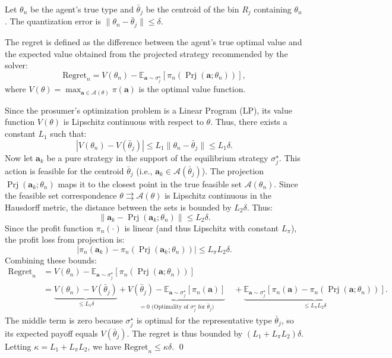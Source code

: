 \documentclass[12pt, notitlepage]{article}
\begin{document}
Let $\theta_n$ be the agent's true type and $\bar{\theta}_j$ be the centroid of the bin $R_j$ containing $\theta_n$. The quantization error is $\|\theta_n - \bar{\theta}_j\| \le \delta$.

The regret is defined as the difference between the agent's true optimal value and the expected value obtained from the projected  strategy recommended by the solver:
$$\text{Regret}_n = V(\theta_n) - \mathbb{E}_{\mathbf{a} \sim \sigma_j^\star} \left[ \pi_n(\operatorname{Prj}(\mathbf{a}; \theta_n)) \right],$$
where $V(\theta) = \max_{\mathbf{a} \in \mathcal{A}(\theta)} \pi(\mathbf{a})$ is the optimal value function.

Since the prosumer's optimization problem is a Linear Program (LP), its value function $V(\theta)$ is Lipschitz continuous with respect to $\theta$. Thus, there exists a constant $L_1$ such that:
$$|V(\theta_n) - V(\bar{\theta}_j)| \le L_1 \|\theta_n - \bar{\theta}_j\| \le L_1 \delta.$$
Now let $\mathbf{a}_k$ be a pure strategy in the support of the equilibrium strategy $\sigma_j^\star$. This action is feasible for the centroid $\bar{\theta}_j$ (i.e., $\mathbf{a}_k \in \mathcal{A}(\bar{\theta}_j)$). The projection $\operatorname{Prj}(\mathbf{a}_k; \theta_n)$ maps it to the closest point in the true feasible set $\mathcal{A}(\theta_n)$. Since the feasible set correspondence $\theta \rightrightarrows \mathcal{A}(\theta)$ is Lipschitz continuous in the Hausdorff metric, the distance between the sets is bounded by $L_2 \delta$. Thus:
$$\|\mathbf{a}_k - \operatorname{Prj}(\mathbf{a}_k; \theta_n)\| \le L_2 \delta.$$
Since the profit function $\pi_n(\cdot)$ is linear (and thus Lipschitz with constant $L_\pi$), the profit loss from projection is:
$$|\pi_n(\mathbf{a}_k) - \pi_n(\operatorname{Prj}(\mathbf{a}_k; \theta_n))| \le L_\pi L_2 \delta.$$
Combining these bounds:
\begin{align*}
\text{Regret}_n &= V(\theta_n) - \mathbb{E}_{\mathbf{a} \sim \sigma_j^\star} [\pi_n(\operatorname{Prj}(\mathbf{a}; \theta_n))] \\
&= \underbrace{V(\theta_n) - V(\bar{\theta}_j)}_{\le L_1 \delta}
+ \underbrace{V(\bar{\theta}_j) - \mathbb{E}_{\mathbf{a} \sim \sigma_j^\star}[\pi_n(\mathbf{a})]}_{= 0 \text{ (Optimality of } \sigma_j^\star \text{ for } \bar{\theta}_j)} 
\quad + \underbrace{\mathbb{E}_{\mathbf{a} \sim \sigma_j^\star}[\pi_n(\mathbf{a}) - \pi_n(\operatorname{Prj}(\mathbf{a}; \theta_n))]}_{\le L_\pi L_2 \delta}.
\end{align*}
The middle term is zero because $\sigma_j^\star$ is optimal for the representative type $\bar{\theta}_j$, so its expected payoff equals $V(\bar{\theta}_j)$. The regret is thus bounded by $(L_1 + L_\pi L_2) \delta$. Letting $\kappa = L_1 + L_\pi L_2$, we have $\text{Regret}_n \le \kappa \delta$. \qed 
\end{document}

